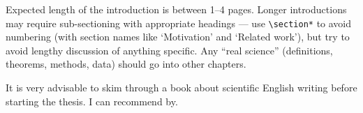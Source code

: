 Expected length of the introduction is between 1--4 pages. Longer introductions may require sub-sectioning with appropriate headings --- use \texttt{\textbackslash{}section*} to avoid numbering (with section names like `Motivation' and `Related work'), but try to avoid lengthy discussion of anything specific. Any ``real science'' (definitions, theorems, methods, data) should go into other chapters.

It is very advisable to skim through a book about scientific English writing before starting the thesis. I can recommend by.

